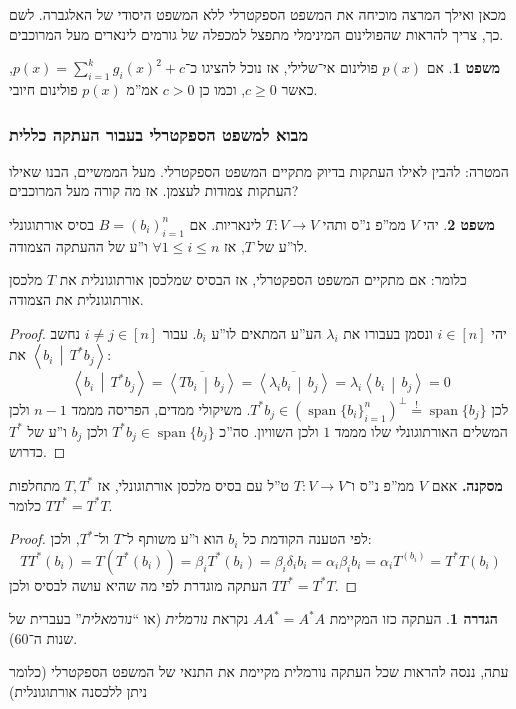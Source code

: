 \documentclass[a4paper]{article}
\newcommand\ra    {\rangle}
\newcommand\la    {\langle}
\newcommand\seq   {\overset{!}{=}}
\newcommand\ol    {\overline}
\DeclareMathOperator{\Sp}      {span}
\newcommand\co        {\colon}
\newcommand\mut [2]   {\left \la #1 \,\middle\vert\, #2 \right \ra}
\newcommand\ag        {\alpha}
\newcommand\bg        {\beta}
\newcommand\dg        {\delta}
\renewcommand\lg      {\lambda}
\theoremstyle{definition}
\newtheorem{Theorem}{משפט}
\newtheorem{definition}{הגדרה}
\newcommand\theo  [1] {\begin{Theorem}#1\end{Theorem}}
\newcommand\defi  [1] {\begin{definition}#1\end{definition}}
\begin{document}
	מכאן ואילך המרצה מוכיחה את המשפט הספקטרלי ללא המשפט היסודי של האלגברה. לשם כך, צריך להראות שהפולינום המינימלי מתפצל למכפלה של גורמים לינארים מעל המרוכבים. 
	
	\theo{אם $p(x)$ פולינום אי־שלילי, אז נוכל להציגו כ־$p(x) = \sum_{i = 1}^{k}g_i(x)^2 + c$, כאשר $c \ge 0$, וכמו כן $c > 0$ אמ''מ $p(x)$ פולינום חיובי. }
	
	\subsubsection{מבוא למשפט הספקטרלי בעבור העתקה כללית}
	
	המטרה: להבין לאילו העתקות בדיוק מתקיים המשפט הספקטרלי. מעל הממשיים, הבנו שאילו העתקות צמודות לעצמן. אז מה קורה מעל המרוכבים? 
	
	\theo{יהי $V$ ממ''פ נ''ס ותהי $T \co V \to V$ לינאריות. אם $B = (b_i)_{i = 1}^{n}$ בסיס אורתוגונלי לו''ע של $T$, אז $\forall 1 \le i \le n$ ו''ע של ההעתקה הצמודה. }
	כלומר: אם מתקיים המשפט הספקטרלי, אז הבסיס שמלכסן אורתוגונלית את $T$ מלכסן אורתוגונלית את הצמודה. 
	\begin{proof}
		יהי $i \in [n]$ ונסמן בעבורו את $\lg_i$ הע''ע המתאים לו''ע $b_i$. עבור $i \neq j \in [n]$ נחשב את $\mut{b_i}{T^*b_j}$: 
		\[ \mut{b_i}{T^*b_j} = \ol{\mut{Tb_i}{b_j}} = \ol{\mut{\lg _i b_i}{b_j}} = \lg_i \mut{b_i}{b_j} = 0 \]
		לכן $T^*b_j \in (\Sp\{b_i\}_{i = 1}^{n})^{\perp} \seq \Sp\{b_j\}$. משיקולי ממדים, הפריסה מממד $n - 1$ ולכן המשלים האורתוגונלי שלו מממד $1$ ולכן השוויון. סה''כ $T^* b_j \in \Sp\{b_j\}$ ולכן $b_j$ ו''ע של $T^*$ כדרוש. 
	\end{proof}
	
	\textbf{מסקנה. }אאם $V$ ממ''פ נ''ס ו־$T \co V \to V$ ט''ל עם בסיס מלכסן אורתוגונלי, אז $T, T^*$ מתחלפות כלומר $TT^* = T^*T$. \begin{proof}
		לפי הטענה הקודמת כל $b_i$ הוא ו''ע משותף ל־$T$ ול־$T^*$, ולכן: 
		\[ TT^*(b_i) = T(T^*(b_i)) = \bg_i T^*(b_i) = \bg_i \dg_i b_i = \ag_i \bg_i b_i = \ag_i T^(b_i) = T^*T(b_i) \]
		העתקה מוגדרת לפי מה שהיא עושה לבסיס ולכן $TT^* = T^*T$. 
	\end{proof}
	\defi{העתקה כזו המקיימת $AA^* = A^*A$ נקראת \textit{נורמלית} (או ``\textit{נורמאלית}'' בעברית של שנות ה־60). }
	
	עתה, ננסה להראות שכל העתקה נורמלית מקיימת את התנאי של המשפט הספקטרלי (כלומר ניתן ללכסנה אורתוגונלית)
	
\end{document}
